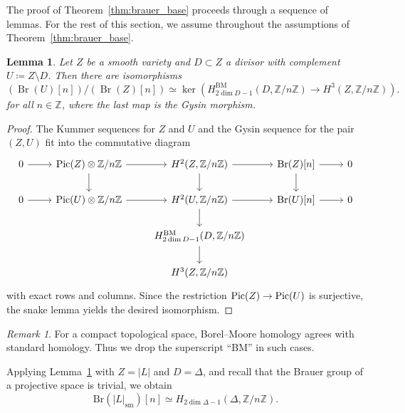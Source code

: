 \documentclass[11pt]{amsart}
\theoremstyle{plain}
\newtheorem{lem}[thm]{Lemma}
\theoremstyle{definition}
\theoremstyle{remark}
\newtheorem{rmk}[thm]{Remark}
\DeclareMathOperator{\Br}{Br}
\newcommand{\Pic}{\mathop{\rm Pic}\nolimits}
\begin{document}
 The proof of Theorem~\ref{thm:brauer_base} proceeds through a sequence of lemmas. For the rest of this section, we assume throughout the assumptions of Theorem~\ref{thm:brauer_base}. 


\begin{lem}\label{lem:brauer_bm}
 Let $Z$ be a smooth variety and $D \subset Z$ a divisor with complement $U \coloneq Z \setminus D$. Then there are isomorphisms
 $$(\Br(U)[n])/(\Br(Z)[n]) \simeq \ker(H^{\mathrm{BM}}_{2\dim D-1}(D, \mathbb Z / n \mathbb Z) \to H^3(Z, \mathbb Z / n \mathbb Z)).$$
 for all $n \in \mathbb Z$, where the last map is the Gysin morphism.
 \end{lem}
\begin{proof}
The Kummer sequences for $Z$ and $U$ and the Gysin sequence for the pair $(Z, U)$ fit into the commutative diagram
    $$
    \begin{tikzcd}
0 \arrow[r] & \Pic(Z)\otimes \mathbb Z / n \mathbb Z \arrow[r] \arrow[d] & {H^2(Z, \mathbb Z / n \mathbb Z)} \arrow[d]   \arrow[r]                     & {\Br(Z)[n]} \arrow[r] \arrow[d] & 0 \\
0 \arrow[r] & \Pic(U)\otimes \mathbb Z / n \mathbb Z \arrow[r] & {H^2(U, \mathbb Z / n \mathbb Z)} \arrow[r] \arrow[d]              & {\Br(U)[n]} \arrow[r]           & 0 \\
            &                                               & {H_{2\dim D-1}^{\mathrm{BM}}(D, \mathbb Z /n \mathbb Z)} \arrow[d] &                                 &   \\
            &                                                            & {H^3(Z, \mathbb Z /n \mathbb Z)}                                   &                                 &  
\end{tikzcd}
    $$
    with exact rows and columns. Since the restriction $\Pic(Z) \to \Pic(U)$ is surjective, the snake lemma yields the desired isomorphism.
\end{proof}

\begin{rmk}
    For a compact topological space, Borel--Moore homology agrees with standard homology. Thus we drop the superscript ``BM'' in such cases.
\end{rmk}

Applying Lemma~\ref{lem:brauer_bm} with $Z = |L|$ and $D = \Delta$, and recall that the Brauer group of a projective space is trivial, we obtain
\begin{equation}\label{eq: Br isom to BM}
\mathrm{Br}(|L|_\mathrm{sm})[n] \simeq H_{2\dim \Delta -1}(\Delta, \mathbb Z/ n\mathbb Z).
\end{equation}
\end{document}
